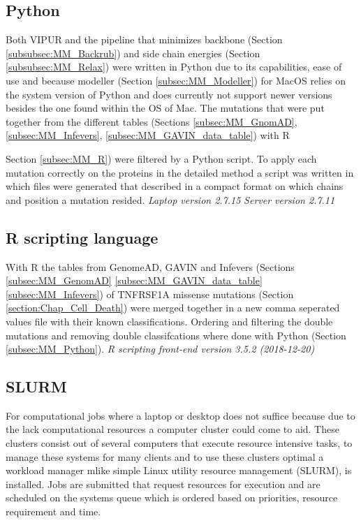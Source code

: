 \subsection{Python}
Both VIPUR and the pipeline that minimizes backbone (Section \ref{subsubsec:MM_Backrub}) and side chain energies (Section \ref{subsubsec:MM_Relax}) were written in Python due to its capabilities, ease of use and because modeller (Section \ref{subsec:MM_Modeller}) for MacOS relies on the system version of Python and does currently not support newer versions besides the one found within the OS of Mac. The mutations that were put together from the different tables (Sections \ref{subsec:MM_GnomAD}, \ref{subsec:MM_Infevers}, \ref{subsec:MM_GAVIN_data_table}) with R {Section \ref{subsec:MM_R}) were filtered by a Python script. To apply each mutation correctly on the proteins in the detailed method a script was written in which files were generated that described in a compact format on which chains and position a mutation resided.
\label{subsec:MM_Python}
\newline
\textit{Laptop version 2.7.15}
\newline
\textit{Server version 2.7.11}

\subsection{R scripting language}
With R the tables from GenomeAD, GAVIN and Infevers (Sections \ref{subsec:MM_GenomAD} \ref{subsec:MM_GAVIN_data_table} \ref{subsec:MM_Infevers}) of TNFRSF1A missense mutations (Section \ref{section:Chap_Cell_Death}) were merged together in a new comma seperated values file with their known classifications. Ordering and filtering the double mutations and removing double classifcations where done with Python (Section \ref{subsec:MM_Python}).
\label{subsec:MM_R}
\newline
\textit{R scripting front-end version 3.5.2 (2018-12-20)}

\subsection{SLURM}
For computational jobs where a laptop or desktop does not suffice because due to the lack computational resources a computer cluster could come to aid. These clusters consist out of several computers that execute resource intensive tasks, to manage these systems for many clients and to use these clusters optimal a workload manager mlike simple Linux utility resource management (SLURM), is installed. Jobs are submitted that request resources for execution and are scheduled on the systems queue which is ordered based on priorities, resource requirement and time.
\label{subsec:MM_SLURM}

}
